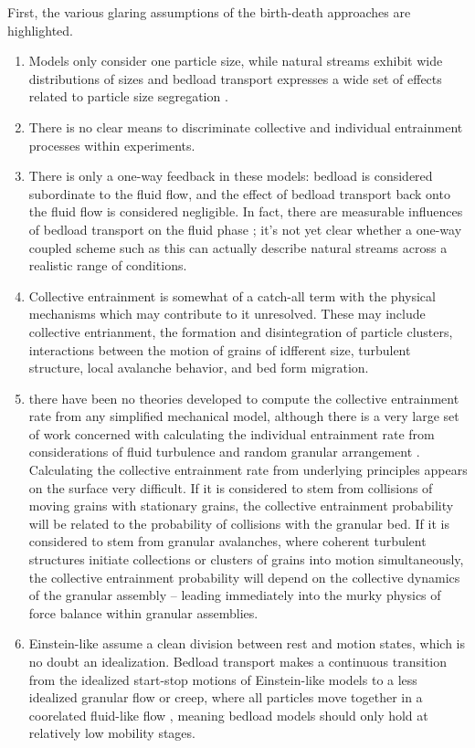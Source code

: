 First, the various glaring assumptions of the birth-death approaches are highlighted. 
\begin{enumerate}
	\item Models only consider one particle size, while natural streams exhibit wide distributions of sizes and bedload transport expresses a wide set of effects related to particle size segregation \citep{Wilcock2003, Parker1982, Chen2008}. 
	\item There is no clear means to discriminate collective and individual entrainment processes within experiments. 
	\item There is only a one-way feedback in these models: bedload is considered subordinate to the fluid flow, and the effect of bedload transport back onto the fluid flow is considered negligible. In fact, there are measurable influences of bedload transport on the fluid phase \citep{}; it's not yet clear whether a one-way coupled scheme such as this can actually describe natural streams across a realistic range of conditions. 
	\item Collective entrainment is somewhat of a catch-all term with the physical mechanisms which may contribute to it unresolved. These may include collective entrianment, the formation and disintegration of particle clusters, interactions between the motion of grains of idfferent size, turbulent structure, local avalanche behavior, and bed form migration. 
	\item there have been no theories developed to compute the collective entrainment rate from any simplified mechanical model, although there is a very large set of work concerned with calculating the individual entrainment rate from considerations of fluid turbulence and random granular arrangement \citep{Einstein1949, Einstein1950, Grass1970, Paintal1971, Cheng1998, Wu2004, Dey2008, Tregnaghi2012, Dey2018}. Calculating the collective entrainment rate from underlying principles appears on the surface very difficult. If it is considered to stem from collisions of moving grains with stationary grains, the collective entrainment probability will be related to the probability of collisions with the granular bed. If it is considered to stem from granular avalanches, where coherent turbulent structures initiate collections or clusters of grains into motion simultaneously, the collective entrainment probability will depend on the collective dynamics of the granular assembly -- leading immediately into the murky physics of force balance within granular assemblies.
	\item Einstein-like assume a clean division between rest and motion states, which is no doubt an idealization. Bedload transport makes a continuous transition from the idealized start-stop motions of Einstein-like models to a less idealized granular flow or creep, where all particles move together in a coorelated fluid-like flow \citep{}, meaning bedload models should only hold at relatively low mobility stages. 

\end{enumerate}

